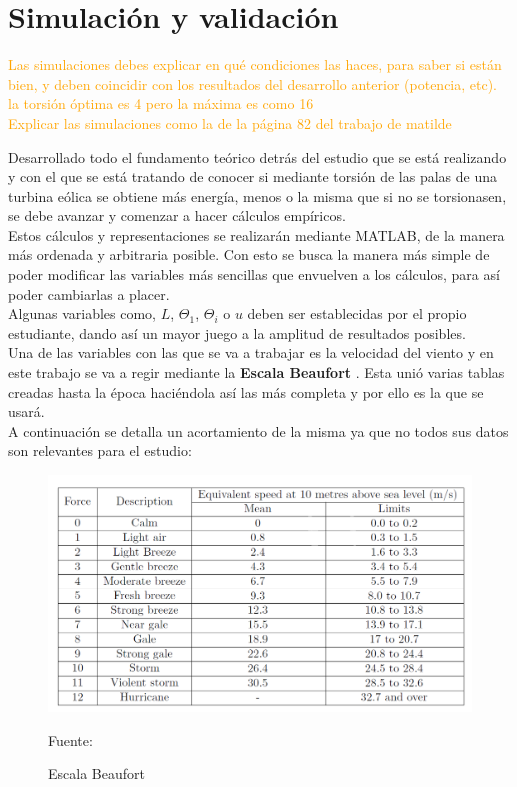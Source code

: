 \section{Simulación y validación}

\textcolor{orange}{\huge Las simulaciones debes explicar en qué condiciones las haces, para saber si están bien, y deben coincidir con los resultados del desarrollo anterior (potencia, etc).\\
la torsión óptima es 4 pero la máxima es como 16\\
Explicar las simulaciones como la de la página 82 del trabajo de matilde}


Desarrollado todo el fundamento teórico detrás del estudio que se está realizando y con el que se está tratando de conocer si mediante torsión de las palas de una turbina eólica se obtiene más energía, menos o la misma que si no se torsionasen, se debe avanzar y comenzar a hacer cálculos empíricos. \\

Estos cálculos y representaciones se realizarán mediante MATLAB, de la manera más ordenada y arbitraria posible. Con esto se busca la manera más simple de poder modificar las variables más sencillas que envuelven a los cálculos, para así poder cambiarlas a placer. \\

Algunas variables como, $L$, $\Theta_1$, $\Theta_i$  o $u$ deben ser establecidas por el propio estudiante, dando así un mayor juego a la amplitud de resultados posibles. \\

Una de las variables con las que se va a trabajar es la velocidad del viento y en este trabajo se va a regir mediante la \textbf{Escala Beaufort} \cite{BeaufortScale2012}. Esta unió varias tablas creadas hasta la época haciéndola así las más completa y por ello es la que se usará.\\

A continuación se detalla un acortamiento de la misma ya que no todos sus datos son relevantes para el estudio:

\begin{figure}[H]
    \centering
    \includegraphics[width=1\textwidth]{images/Tabla Beaufort Efect.png}
    \caption{Escala Beaufort}
     Fuente: \cite{BeaufortScale2012}
     \label{tabla:escala_beaufort}
\end{figure}

